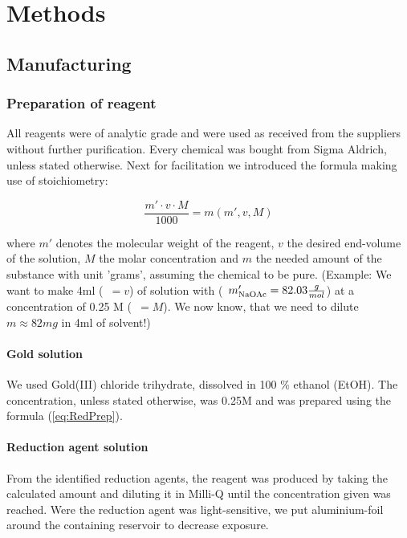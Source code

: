 \section{Methods}
\label{sec:Methods}

\subsection{Manufacturing}

\subsubsection{Preparation of reagent}

All reagents were of analytic grade and were used as received from the suppliers without further  purification. Every chemical was bought from Sigma Aldrich, unless stated otherwise. 
Next for facilitation we introduced the formula making use of stoichiometry:

\begin{equation}
\label{eq:RedPrep}
    \frac{m'\cdot v\cdot M}{1000} = m(m',v,M)
\end{equation}


where $m'$ denotes the molecular weight of the reagent, $v$ the desired end-volume of the solution, $M$ the molar concentration and $m$ the needed amount of the substance with unit 'grams', assuming the chemical to be pure. (Example: We want to make 4ml (~$= v$) of solution with  (~$m'_{\ce{NaOAc}}= 82.03 \frac{g}{mol}$) at a concentration of 0.25 M (~$= M$). We now know, that we need to dilute $m \approx 82mg$  in 4ml of solvent!) 

\paragraph{Gold solution}

We used Gold(III) chloride trihydrate, dissolved in 100 \% ethanol (EtOH). The concentration, unless stated otherwise, was 0.25M and was prepared using the formula (\ref{eq:RedPrep}).


\paragraph{Reduction agent solution}

From the identified reduction agents, the reagent was produced by taking the calculated amount and diluting it in Milli-Q  until the concentration given was reached. Were the reduction agent was light-sensitive, we put aluminium-foil around the containing reservoir to decrease exposure.


